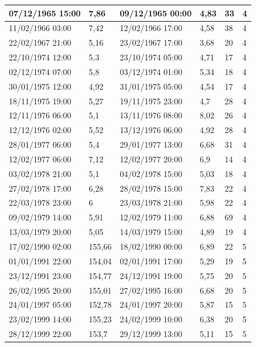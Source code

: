 \documentclass[11pt]{article}
\begin{document}
\begin{longtable}{|l|p{2.3cm}|l|p{2.3cm}|l|l|}
        07/12/1965 15:00 & 7,86 & 09/12/1965 00:00 & 4,83 & 33 & 4 \\ \hline
        11/02/1966 03:00 & 7,42 & 12/02/1966 17:00 & 4,58 & 38 & 4 \\ \hline
        22/02/1967 21:00 & 5,16 & 23/02/1967 17:00 & 3,68 & 20 & 4 \\ \hline
        22/10/1974 12:00 & 5,3 & 23/10/1974 05:00 & 4,71 & 17 & 4 \\ \hline
        02/12/1974 07:00 & 5,8 & 03/12/1974 01:00 & 5,34 & 18 & 4 \\ \hline
        30/01/1975 12:00 & 4,92 & 31/01/1975 05:00 & 4,54 & 17 & 4 \\ \hline
        18/11/1975 19:00 & 5,27 & 19/11/1975 23:00 & 4,7 & 28 & 4 \\ \hline
        12/11/1976 06:00 & 5,1 & 13/11/1976 08:00 & 8,02 & 26 & 4 \\ \hline
        12/12/1976 02:00 & 5,52 & 13/12/1976 06:00 & 4,92 & 28 & 4 \\ \hline
        28/01/1977 06:00 & 5,4 & 29/01/1977 13:00 & 6,68 & 31 & 4 \\ \hline
        12/02/1977 06:00 & 7,12 & 12/02/1977 20:00 & 6,9 & 14 & 4 \\ \hline
        03/02/1978 21:00 & 5,1 & 04/02/1978 15:00 & 5,03 & 18 & 4 \\ \hline
        27/02/1978 17:00 & 6,28 & 28/02/1978 15:00 & 7,83 & 22 & 4 \\ \hline
        22/03/1978 23:00 & 6 & 23/03/1978 21:00 & 5,98 & 22 & 4 \\ \hline
        09/02/1979 14:00 & 5,91 & 12/02/1979 11:00 & 6,88 & 69 & 4 \\ \hline
        13/03/1979 20:00 & 5,05 & 14/03/1979 15:00 & 4,89 & 19 & 4 \\ \hline
        17/02/1990 02:00 & 155,66 & 18/02/1990 00:00 & 6,89 & 22 & 5 \\ \hline
        01/01/1991 22:00 & 154,04 & 02/01/1991 17:00 & 5,29 & 19 & 5 \\ \hline
        23/12/1991 23:00 & 154,77 & 24/12/1991 19:00 & 5,75 & 20 & 5 \\ \hline
        26/02/1995 20:00 & 155,01 & 27/02/1995 16:00 & 6,68 & 20 & 5 \\ \hline
        24/01/1997 05:00 & 152,78 & 24/01/1997 20:00 & 5,87 & 15 & 5 \\ \hline
        23/02/1999 14:00 & 155,23 & 24/02/1999 10:00 & 6,38 & 20 & 5 \\ \hline
        28/12/1999 22:00 & 153,7 & 29/12/1999 13:00 & 5,11 & 15 & 5 \\ \hline

\end{longtable}
\end{document}
